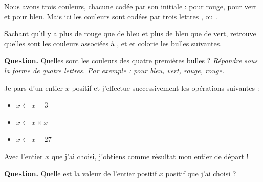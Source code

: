 \documentclass[class=report,crop=false, 12pt]{standalone}
\begin{document}
\begin{enigme}[Répéter]

Nous avons trois couleurs, chacune codée par son initiale :  pour rouge,  pour vert et  pour bleu. Mais ici les couleurs sont codées par trois lettres ,  ou .

\centerline{}

Sachant qu'il y a plus de rouge que de bleu et plus de bleu que de vert, retrouve quelles sont les couleurs associées à ,  et  et colorie les bulles suivantes.

 
\bigskip

\textbf{Question.} Quelles sont les couleurs des quatre premières bulles ?
\emph{Répondre sous la forme de quatre lettres. Par exemple :  pour bleu, vert, rouge, rouge.}


%
%

\end{enigme}



\begin{enigme}


Je pars d'un entier $x$ positif et j'effectue successivement les opérations suivantes :
    \begin{itemize}
      \item $x \leftarrow x-3$
      \item $x \leftarrow x \times x$ 
      \item $x \leftarrow x - 27$
    \end{itemize}

Avec l'entier $x$ que j'ai choisi, j'obtiens comme résultat mon entier de départ !
 
\bigskip

\textbf{Question.} Quelle est la valeur de l'entier positif $x$ positif que j'ai choisi ?

%
%   

\end{enigme}
\end{document}
